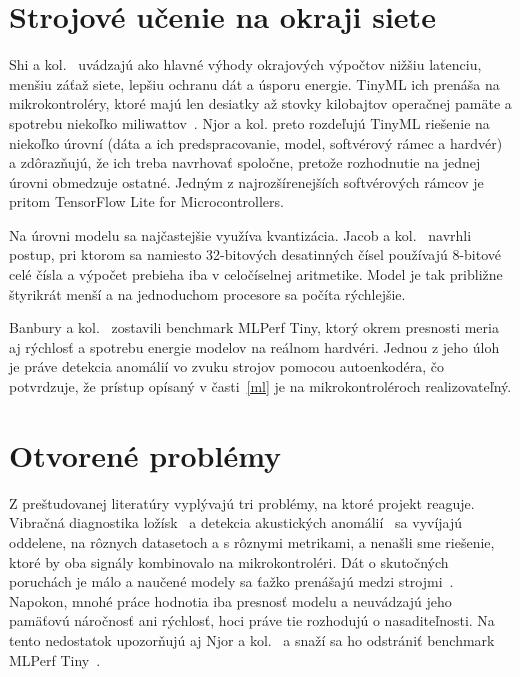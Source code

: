 \documentclass[10pt,twoside,slovak,a4paper]{article}
\begin{document}
\section{Strojové učenie na okraji siete} \label{tinyml}

Shi a kol.~\cite{shi2016edge} uvádzajú ako hlavné výhody okrajových výpočtov nižšiu latenciu, menšiu záťaž siete, lepšiu ochranu dát a úsporu energie. TinyML ich prenáša na mikrokontroléry, ktoré majú len desiatky až stovky kilobajtov operačnej pamäte a spotrebu niekoľko miliwattov~\cite{10781407}. Njor a kol. preto rozdeľujú TinyML riešenie na niekoľko úrovní (dáta a ich predspracovanie, model, softvérový rámec a hardvér) a zdôrazňujú, že ich treba navrhovať spoločne, pretože rozhodnutie na jednej úrovni obmedzuje ostatné. Jedným z najrozšírenejších softvérových rámcov je pritom TensorFlow Lite for Microcontrollers.

Na úrovni modelu sa najčastejšie využíva kvantizácia. Jacob a kol.~\cite{jacob2018} navrhli postup, pri ktorom sa namiesto 32-bitových desatinných čísel používajú 8-bitové celé čísla a výpočet prebieha iba v celočíselnej aritmetike. Model je tak približne štyrikrát menší a na jednoduchom procesore sa počíta rýchlejšie.

Banbury a kol.~\cite{banbury2021mlperf} zostavili benchmark MLPerf Tiny, ktorý okrem presnosti meria aj rýchlosť a spotrebu energie modelov na reálnom hardvéri. Jednou z jeho úloh je práve detekcia anomálií vo zvuku strojov pomocou autoenkodéra, čo potvrdzuje, že prístup opísaný v časti~\ref{ml} je na mikrokontroléroch realizovateľný.




\section{Otvorené problémy} \label{problemy}

Z preštudovanej literatúry vyplývajú tri problémy, na ktoré projekt reaguje. Vibračná diagnostika ložísk~\cite{lei2020} a detekcia akustických anomálií~\cite{koizumi2020dcase} sa vyvíjajú oddelene, na rôznych datasetoch a s rôznymi metrikami, a nenašli sme riešenie, ktoré by oba signály kombinovalo na mikrokontroléri. Dát o skutočných poruchách je málo a naučené modely sa ťažko prenášajú medzi strojmi~\cite{lei2020}. Napokon, mnohé práce hodnotia iba presnosť modelu a neuvádzajú jeho pamäťovú náročnosť ani rýchlosť, hoci práve tie rozhodujú o nasaditeľnosti. Na tento nedostatok upozorňujú aj Njor a kol.~\cite{10781407} a snaží sa ho odstrániť benchmark MLPerf Tiny~\cite{banbury2021mlperf}.
\end{document}
